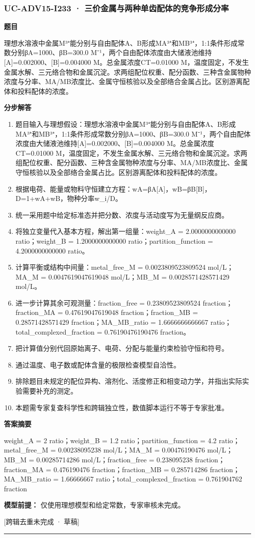 \documentclass[UTF8,11pt,a4paper]{ctexart}
\begin{document}
\subsubsection*{UC-ADV15-I233 · 三价金属与两种单齿配体的竞争形成分率}
\noindent\textbf{题目}\par
理想水溶液中金属M³⁺能分别与自由配体A、B形成MA³⁺和MB³⁺，1:1条件形成常数分别βA=1000、βB=300.0 M⁻¹，两个自由配体浓度由大储液池维持[A]=0.002000、[B]=0.004000 M。总金属浓度CT=0.01000 M，温度固定，不发生金属水解、三元络合物和金属沉淀。求两组配位权重、配分函数、三种含金属物种浓度与分率、MA/MB浓度比、金属守恒核验以及全部络合金属占比。区别游离配体和投料配体的浓度。\par
\medskip\noindent\textbf{分步解答}
\begin{enumerate}
\item 题目输入与理想假设：理想水溶液中金属M³⁺能分别与自由配体A、B形成MA³⁺和MB³⁺，1:1条件形成常数分别βA=1000、βB=300.0 M⁻¹，两个自由配体浓度由大储液池维持[A]=0.002000、[B]=0.004000 M。总金属浓度CT=0.01000 M，温度固定，不发生金属水解、三元络合物和金属沉淀。求两组配位权重、配分函数、三种含金属物种浓度与分率、MA/MB浓度比、金属守恒核验以及全部络合金属占比。区别游离配体和投料配体的浓度。
\item 根据电荷、能量或物料守恒建立方程：wA=βA[A]，wB=βB[B]，D=1+wA+wB，物种分率w\_i/D。
\item 统一采用题中给定标准态并把分数、浓度与活动度写为无量纲反应商。
\item 将独立变量代入基本方程，解出第一组量：weight\_A = 2.0000000000000 ratio；weight\_B = 1.2000000000000 ratio；partition\_function = 4.2000000000000 ratio。
\item 计算平衡或结构中间量：metal\_free\_M = 0.0023809523809524 mol/L；MA\_M = 0.0047619047619048 mol/L；MB\_M = 0.0028571428571429 mol/L。
\item 进一步计算其余可观测量：fraction\_free = 0.23809523809524 fraction；fraction\_MA = 0.47619047619048 fraction；fraction\_MB = 0.28571428571429 fraction；MA\_MB\_ratio = 1.6666666666667 ratio；total\_complexed\_fraction = 0.76190476190476 fraction。
\item 把计算值分别代回原始离子、电荷、分配与能量约束检验守恒和符号。
\item 通过温度、电子数或配体含量的极限检查模型自洽性。
\item 排除题目未规定的配位异构、溶剂化、活度修正和相变动力学，并指出实际实验需要补充的测定。
\item 本题需专家复查科学性和跨辑独立性，数值脚本运行不等于专家批准。
\end{enumerate}
\noindent\textbf{答案摘要}\par
weight\_A = 2 ratio；weight\_B = 1.2 ratio；partition\_function = 4.2 ratio；metal\_free\_M = 0.00238095238 mol/L；MA\_M = 0.00476190476 mol/L；MB\_M = 0.00285714286 mol/L；fraction\_free = 0.238095238 fraction；fraction\_MA = 0.476190476 fraction；fraction\_MB = 0.285714286 fraction；MA\_MB\_ratio = 1.66666667 ratio；total\_complexed\_fraction = 0.761904762 fraction\par
\noindent\textbf{模型前提：}
仅使用理想模型和给定常数，专家审核未完成。\par
\noindent\textcolor{red!65!black}{[跨辑去重未完成 · 草稿]} \par
\medskip\hrule\medskip
{}
\end{document}
